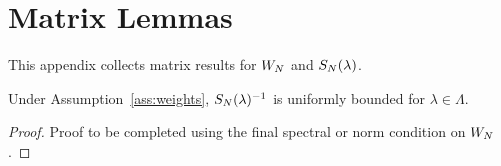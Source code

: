 \section{Matrix Lemmas}\label{app:matrix-lemmas}

This appendix collects matrix results for $W_N$ and $S_N(\lambda)$.

\begin{lemma}\label{lem:spatial-multiplier-bound}
Under Assumption~\ref{ass:weights}, $S_N(\lambda)^{-1}$ is uniformly bounded for $\lambda\in\Lambda$.
\end{lemma}

\begin{proof}
Proof to be completed using the final spectral or norm condition on $W_N$.
\end{proof}


